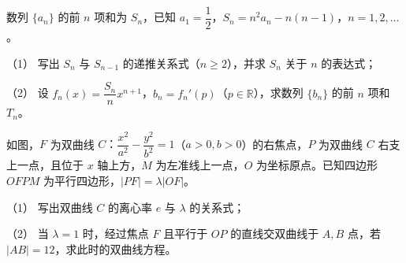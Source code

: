 \begin{question}
数列 $\{a_n\}$ 的前 $n$ 项和为 $S_n$，已知 $a_1=\dfrac12$，$S_n=n^2a_n-n(n-1)$，$n=1,2,\ldots$。

（1） 写出 $S_n$ 与 $S_{n-1}$ 的递推关系式（$n\geqslant2$），并求 $S_n$ 关于 $n$ 的表达式；

（2） 设 $f_n(x)=\dfrac{S_n}{n}x^{n+1}$，$b_n=f_n'(p)$（$p\in\mathbb R$），求数列 $\{b_n\}$ 的前 $n$ 项和 $T_n$。

\Needspace{0.4\textheight}
\end{question}
\begin{question}
如图，$F$ 为双曲线 $C\text{：}\dfrac{x^2}{a^2}-\dfrac{y^2}{b^2}=1$（$a>0,b>0$）的右焦点，$P$ 为双曲线 $C$ 右支上一点，且位于 $x$ 轴上方，$M$ 为左准线上一点，$O$ 为坐标原点。已知四边形 $OFPM$ 为平行四边形，$|PF|=\lambda|OF|$。

（1） 写出双曲线 $C$ 的离心率 $e$ 与 $\lambda$ 的关系式；

（2） 当 $\lambda=1$ 时，经过焦点 $F$ 且平行于 $OP$ 的直线交双曲线于 $A,B$ 点，若 $|AB|=12$，求此时的双曲线方程。
\nopagebreak[4]
\begin{center}\end{center}
\nopagebreak[4]

\end{question}